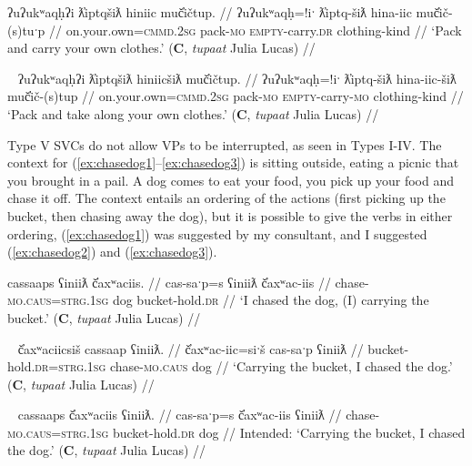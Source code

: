 \ex \label{ex:packandcarry}
\begingl
\glpreamble ʔuʔukʷaqḥʔi ƛ̓iptqšiƛ hiniic muč̓ičtup. //
\gla ʔuʔukʷaqḥ=!iˑ ƛ̓iptq-šiƛ hina-iic muč̓ič-(s)tuˑp //
\glb on.your.own=\textsc{cmmd.2sg} pack-\textsc{mo} \textsc{empty}-carry.\textsc{dr} clothing-kind //
\glft `Pack and carry your own clothes.' (\textbf{C}, \textit{tupaat} Julia Lucas) //
\endgl
\xe

\ex~ \label{ex:packandtake}
\begingl
\glpreamble ʔuʔukʷaqḥʔi ƛ̓iptqšiƛ hiniicšiƛ muč̓ičtup. //
\gla ʔuʔukʷaqḥ=!iˑ ƛ̓iptq-šiƛ hina-iic-šiƛ muč̓ič-(s)tup //
\glb on.your.own=\textsc{cmmd.2sg} pack-\textsc{mo} \textsc{empty}-carry-\textsc{mo} clothing-kind //
\glft `Pack and take along your own clothes.' (\textbf{C}, \textit{tupaat} Julia Lucas) //
\endgl
\xe

Type V SVCs do not allow VPs to be interrupted, as seen in Types I-IV. The context for (\ref{ex:chasedog1}--\ref{ex:chasedog3}) is sitting outside, eating a picnic that you brought in a pail. A dog comes to eat your food, you pick up your food and chase it off. The context entails an ordering of the actions (first picking up the bucket, then chasing away the dog), but it is possible to give the verbs in either ordering, (\ref{ex:chasedog1}) was suggested by my consultant, and I suggested (\ref{ex:chasedog2}) and (\ref{ex:chasedog3}). 

\ex \label{ex:chasedog1}
\begingl
\glpreamble cassaaps ʕiniiƛ č̓axʷaciis. //
\gla cas-saˑp=s ʕiniiƛ č̓axʷac-iis //
\glb chase-\textsc{mo.caus}=\textsc{strg.1sg} dog bucket-hold.\textsc{dr} //
\glft `I chased the dog, (I) carrying the bucket.' (\textbf{C}, \textit{tupaat} Julia Lucas) //
\endgl
\xe

\ex~ \label{ex:chasedog2}
\begingl
\glpreamble č̓axʷaciicsiš cassaap ʕiniiƛ. //
\gla č̓axʷac-iic=siˑš cas-saˑp ʕiniiƛ //
\glb bucket-hold.\textsc{dr}=\textsc{strg.1sg} chase-\textsc{mo.caus} dog //
\glft `Carrying the bucket, I chased the dog.' (\textbf{C}, \textit{tupaat} Julia Lucas) //
\endgl
\xe

\ex~ \label{ex:chasedog3}
\begingl
\glpreamble *cassaaps č̓axʷaciis ʕiniiƛ. //
\gla cas-saˑp=s č̓axʷac-iis ʕiniiƛ //
\glb chase-\textsc{mo.caus}=\textsc{strg.1sg} bucket-hold.\textsc{dr} dog //
\glft Intended: `Carrying the bucket, I chased the dog.' (\textbf{C}, \textit{tupaat} Julia Lucas) //
\endgl
\xe


